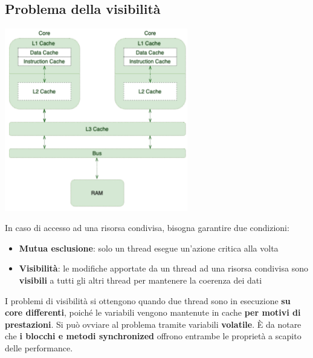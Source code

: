 \documentclass[12pt]{article}
\begin{document}
\subsection{Problema della visibilità}
\begin{center}
    \includegraphics[width = 0.60\textwidth]{Images/88.png}
\end{center}
In caso di accesso ad una risorsa condivisa, bisogna garantire due condizioni:
\begin{itemize}
    \item \textbf{Mutua esclusione}: solo un thread esegue un'azione critica alla volta
    \item \textbf{Visibilità}: le modifiche apportate da un thread ad una risorsa condivisa sono \textbf{visibili} a tutti gli altri thread per mantenere la coerenza dei dati
\end{itemize}
I problemi di visibilità si ottengono quando due thread sono in esecuzione \textbf{su core differenti}, poiché le variabili vengono mantenute in cache \textbf{per motivi di prestazioni}. Si può ovviare al problema tramite variabili \textbf{volatile}. È da notare che \textbf{i blocchi e metodi synchronized} offrono entrambe le proprietà a scapito delle performance.
\end{document}
